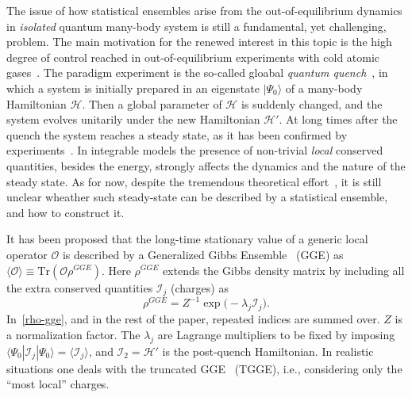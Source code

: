 \documentclass[twocolumn,superscriptaddress,prb,10pt]{revtex4-1}
\begin{document}
The issue of how statistical ensembles arise from the out-of-equilibrium 
dynamics in {\it isolated} quantum many-body system is still a fundamental, 
yet challenging, problem. The main motivation for the renewed interest 
in this topic is the high degree of control reached in out-of-equilibrium 
experiments with cold atomic gases~\cite{bloch-2008,greiner-2002,kinoshita-2006,
hofferberth-2007,trotzky-2012,gring-2012,cheneau-2012,
schneider-2012,kunhert-2013,langen-2013,meinert-2013,fukuhara-2013,
ronzheimer-2013,braun-2014,langen-2015}. The paradigm experiment is the so-called gloabal 
{\it quantum quench}~\cite{polkovnikov-2011}, in which a system is initially 
prepared in an eigenstate $|\Psi_0\rangle$ of a many-body Hamiltonian ${\mathcal 
H}$. Then a global parameter of ${\mathcal H}$ is suddenly changed, and the 
system evolves unitarily under the new Hamiltonian ${\mathcal H}'$. At long times 
after the quench the system reaches a steady state, as it has been confirmed by 
experiments~\cite{kinoshita-2006}. In integrable models the 
presence of non-trivial {\it local} conserved quantities, besides the energy, 
strongly affects the dynamics and the nature of the steady state. As for now,  
despite the tremendous theoretical effort~\cite{calabrese-2006,rigol-2007,calabrese-2007,
kollath-2007,manmana-2007,rigol-2008,cramer-2008,barthel-2008,kollar-2008,moeckel-2008,
iucci-2009,rossini-2009,barmettler-2009,biroli-2010,rossini-2010,fioretto-2010,
gogolin-2011,banuls-2011,calabrese-2011,rigol-2011,calabrese-2012,caux-2012,essler-2012,
cazalilla-2012,mossel-2012a,collura-2013,mussardo-2013,caux-2013,fagotti-2013a,fagotti-2013,
sotiriadis-2014,fagotti-2014,essler-2014,goldstein-2014,de-nardis-2014,wright-2014,
pozsgay-2014,wouters-2014,mestyian-2015,ilievski-2015a}, 
it is still unclear wheather such steady-state can be described by a statistical 
ensemble, and how to construct it. 

It has been proposed that the long-time stationary value of a generic 
local operator ${\mathcal O}$ is described by a Generalized Gibbs Ensemble~\cite{
rigol-2007,rigol-2008} (GGE) as $\langle{\mathcal O}\rangle\equiv\textrm{Tr}({\mathcal O}
\rho^{GGE})$. Here $\rho^{GGE}$ extends the Gibbs density matrix by including  all 
the extra conserved quantities $ {\mathcal I}_j$ (charges) as 
%
\begin{equation}
\rho^{GGE}=Z^{-1}\exp\big(-\lambda_j{\mathcal I}_j\big). 
\label{rho-gge}
\end{equation}
%
In~\eqref{rho-gge}, and in the rest of the paper, repeated indices are summed over. 
$Z$ is a normalization factor. The $\lambda_j$ are Lagrange multipliers to be fixed 
by imposing $\langle\Psi_0|{\mathcal I}_j|\Psi_0\rangle=\langle{\mathcal 
I}_j\rangle$, and ${\mathcal I}_2={\mathcal H}'$ is the post-quench Hamiltonian. 
In realistic situations one deals with the truncated GGE~\cite{fagotti-2013} (TGGE), 
i.e., considering only the ``most local'' charges. 
\end{document}
